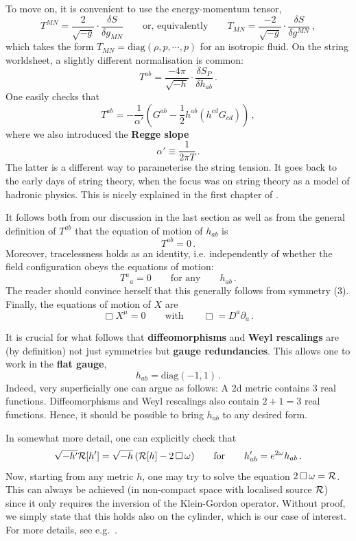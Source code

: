\documentclass[12pt]{article}
\newcommand{\be}{\begin{equation}}
\newcommand{\ee}{\end{equation}}
\numberwithin{equation}{section}
\begin{document}
To move on, it is convenient to use the energy-momentum tensor,
\be
T^{MN}=\frac{2}{\sqrt{-g}}\cdot\frac{\delta S}{\delta g_{MN}}\qquad\mbox{or, equivalently}\qquad T_{MN}=\frac{-2}{\sqrt{-g}}\cdot\frac{\delta S}{\delta g^{MN}}\,,
\ee
which takes the form $T_{MN}=\mbox{diag}(\rho,p,\cdots,p)$ for an isotropic fluid. On the string worldsheet, a slightly different normalisation is common:
\be
T^{ab}=\frac{-4\pi}{\sqrt{-h}}\cdot\frac{\delta S_P}{\delta h_{ab}}\,.
\ee
One easily checks that 
\be
T^{ab}=-\frac{1}{\alpha'}\left(G^{ab}-\frac{1}{2}h^{ab}(h^{cd}G_{cd})\right)\,,
\ee
where we also introduced the {\bf Regge slope}
\be
\alpha'\equiv \frac{1}{2\pi T}\,.
\ee
The latter is a different way to parameterise the string tension. It goes back to the early days of string theory, when the focus was on string theory as a model of hadronic physics. This is nicely explained in the first chapter of \cite{Green:1987sp}. 

It follows both from our discussion in the last section as well as from the general definition of $T^{ab}$ that the equation of motion of $h_{ab}$ is
\be
T^{ab}=0\,.
\ee
Moreover, tracelessness holds as an identity, i.e. independently of whether the field configuration obeys the equations of motion:
\be
T^a{}_a=0\qquad\mbox{for any}\qquad h_{ab}\,.
\ee
The reader should convince herself that this generally follows from symmetry (3). Finally, the equations of motion of $X$ are
\be
\Box X^\mu=0\qquad\mbox{with}\qquad \Box=D^a\partial_a\,.
\ee

It is crucial for what follows that {\bf diffeomorphisms} and {\bf Weyl rescalings} are (by definition) not just symmetries but {\bf gauge redundancies}. This allows one to work in the {\bf flat gauge},
\be
h_{ab}=\mbox{diag}(-1,1)\,.\label{flme}
\ee
Indeed, very superficially one can argue as follows: A 2d metric contains 3 real functions. Diffeomorphisms and Weyl rescalings also contain $2+1=3$ real functions. Hence, it should be possible to bring $h_{ab}$ to any desired form. 

In somewhat more detail, one can explicitly check that
\be
\sqrt{-h'}{\cal R}[h']=\sqrt{-h}\,({\cal R}[h]-2\,\Box\,\omega)\qquad \mbox{for}\qquad h_{ab}'=e^{2\omega}h_{ab}\,.
\ee
Now, starting from any metric $h$, one may try to solve the equation $2\,\Box\,\omega={\cal R}$. This can always be achieved (in non-compact space with localised source ${\cal R}$) since it only requires the inversion of the Klein-Gordon operator. Without proof, we simply state that this holds also on the cylinder, which is our case of interest. For more details, see e.g.~\cite{Blumenhagen:2013fgp}. 
\end{document}
